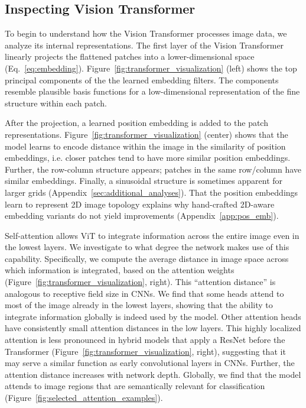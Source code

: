 \subsection{Inspecting Vision Transformer}

To begin to understand how the Vision Transformer processes image data, we analyze its internal representations. The first layer of the Vision Transformer linearly projects the flattened patches into a lower-dimensional space (Eq.~\ref{eq:embedding}). 
Figure~\ref{fig:transformer_visualization} (left) shows the top principal components of the the learned embedding filters. The components resemble plausible basis functions for a low-dimensional representation of the fine structure within each patch.

After the projection, a learned position embedding is added to the  patch representations. 
Figure~\ref{fig:transformer_visualization} (center) shows that the model learns to encode distance within the image in the similarity of position embeddings, i.e. closer patches tend to have more similar position embeddings. Further, the row-column structure appears; patches in the same row/column have similar embeddings. Finally, a sinusoidal structure is sometimes apparent for larger grids (Appendix~\ref{sec:additional_analyses}). 
That the position embeddings learn to represent 2D image topology explains why hand-crafted 2D-aware embedding variants do not yield improvements (Appendix~\ref{app:pos_emb}).

Self-attention allows ViT to integrate information across the entire image even in the lowest layers. We investigate to what degree the network makes use of this capability. Specifically, we compute the average distance in image space across which information is integrated, based on the attention weights (Figure~\ref{fig:transformer_visualization}, right). This ``attention distance'' is analogous to receptive field size in CNNs. We find that some heads attend to most of the image already in the lowest layers, showing that the ability to integrate information globally is indeed used by the model. Other attention heads have consistently small attention distances in the low layers. This highly localized attention is less pronounced in hybrid models that apply a ResNet before the Transformer (Figure~\ref{fig:transformer_visualization}, right), suggesting that it may serve a similar function as early convolutional layers in CNNs. Further, the attention distance increases with network depth. Globally, we find that the model attends to image regions that are semantically relevant for classification (Figure~\ref{fig:selected_attention_examples}).

